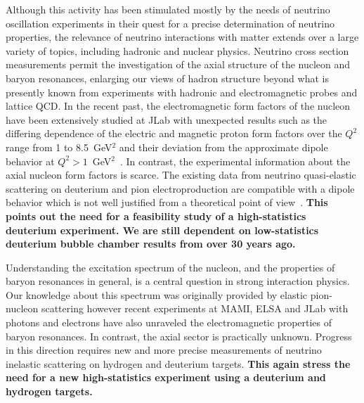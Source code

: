 Although this activity has been stimulated mostly by the needs of neutrino oscillation experiments in their quest for a precise determination of neutrino properties, the relevance of neutrino interactions with matter extends over a large variety of topics, including hadronic and nuclear physics.  Neutrino cross section measurements permit the investigation of the axial structure of the nucleon and baryon resonances, enlarging our views of hadron structure beyond what is presently known from experiments with hadronic and electromagnetic probes and lattice QCD. In the recent past, the electromagnetic form factors of the nucleon have been extensively studied at JLab with unexpected results such as the differing dependence of the electric and magnetic proton form factors over the $Q^2$ range from 1 to 8.5~GeV$^2$ and their deviation from the approximate dipole behavior at $Q^2 > 1$~GeV$^2$~\cite{Perdrisat:2006hj}. In contrast, the experimental information about the axial nucleon form factors is scarce. The existing data from neutrino quasi-elastic scattering on deuterium and pion electroproduction are compatible with a dipole behavior which is not well justified from a theoretical point of view~\cite{Bhattacharya:2011ah}. {\bf This points out the need for a feasibility study of a high-statistics deuterium experiment.  We are still dependent on low-statistics deuterium bubble chamber results from over 30 years ago.} 

Understanding the excitation spectrum of the nucleon, and the properties of baryon resonances in general,  is a central question in strong interaction physics. Our knowledge about this spectrum was originally provided by elastic pion-nucleon scattering however recent experiments at MAMI, ELSA and JLab with photons and electrons have also unraveled the electromagnetic properties of baryon resonances. In contrast, the axial sector is practically unknown. Progress in this direction requires new and more precise measurements of neutrino inelastic scattering on hydrogen and deuterium targets.  {\bf This again stress the need for a new high-statistics experiment using a deuterium and hydrogen targets.}

